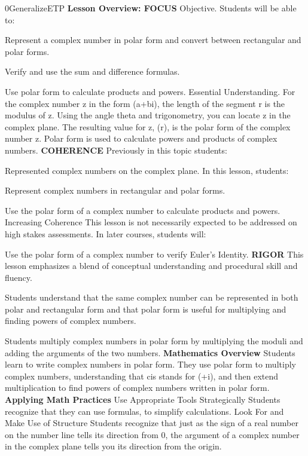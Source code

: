\documentclass{article}
\newenvironment{te-addendum}[2]{}{}     %
\newcommand{\te}[1]{}                   %
\begin{document}
\begin{te-addendum}{0}{GeneralizeETP}
\textbf{Lesson Overview: FOCUS}
Objective. Students will be able to:
\item Represent a complex number in polar form and convert between rectangular and polar forms.
\item Verify and use the sum and difference formulas.
\item Use polar form to calculate products and powers.
Essential Understanding. For the complex number z in the form (a+bi), the length of the segment r is the modulus of z. Using the angle theta and trigonometry, you can locate z in the complex plane. The resulting value for z, (r\theta), is the polar form of the complex number z. Polar form is used to calculate powers and products of complex numbers.
\textbf{COHERENCE}
Previously in this topic students:
\item Represented complex numbers on the complex plane.
In this lesson, students:
\item Represent complex numbers in rectangular and polar forms.
\item Use the polar form of a complex number to calculate products and powers.
Increasing Coherence This lesson is not necessarily expected to be addressed on high stakes assessments.
In later courses, students will:
\item Use the polar form of a complex number to verify Euler's Identity.
\textbf{RIGOR}
This lesson emphasizes a blend of conceptual understanding and procedural skill and fluency.
\item Students understand that the same complex number can be represented in both polar and rectangular form and that polar form is useful for multiplying and finding powers of complex numbers.
\item Students multiply complex numbers in polar form by multiplying the moduli and adding the arguments of the two numbers.
\textbf{Mathematics Overview}
Students learn to write complex numbers in polar form. They use polar form to multiply complex numbers, understanding that cis stands for (\cos\theta+i\sin\theta), and then extend multiplication to find powers of complex numbers written in polar form.
\textbf{Applying Math Practices}
Use Appropriate Tools Strategically
Students recognize that they can use formulas, to simplify calculations.
Look For and Make Use of Structure
Students recognize that just as the sign of a real number on the number line tells its direction from 0, the argument of a complex number in the complex plane tells you its direction from the origin.
\te{Program Resources. SavvasRealize.com.}
\end{te-addendum}
\end{document}

